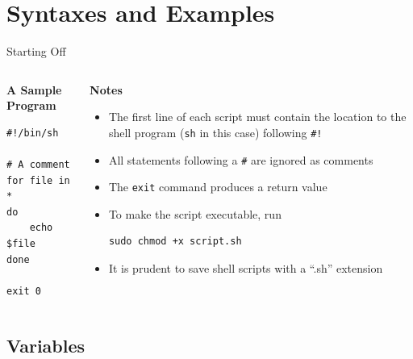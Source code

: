 \documentclass{beamer}
\begin{document}
\section{Syntaxes and Examples}
\begin{frame}[fragile]{Starting Off}
  \begin{columns}
    \begin{column}{0.3\textwidth}
      \textbf{A Sample Program}
\begin{verbatim}
#!/bin/sh

# A comment
for file in *
do
    echo $file
done

exit 0  
\end{verbatim}
    \end{column}
    \begin{column}{0.7\textwidth}
      \textbf{Notes}
      \begin{itemize}
        \item The first line of each script must contain the location
          to the shell program (\verb|sh| in this case) following
          \verb|#!|
        \item All statements following a \verb|#| are ignored as
          comments
        \item The \verb|exit| command produces a return value
        \item To make the script executable, run
\begin{verbatim}
sudo chmod +x script.sh
\end{verbatim}
        \item It is prudent to save shell scripts with a ``.sh''
          extension 
      \end{itemize}
    \end{column}    
  \end{columns}
\end{frame}

\subsection{Variables}
\end{document}
